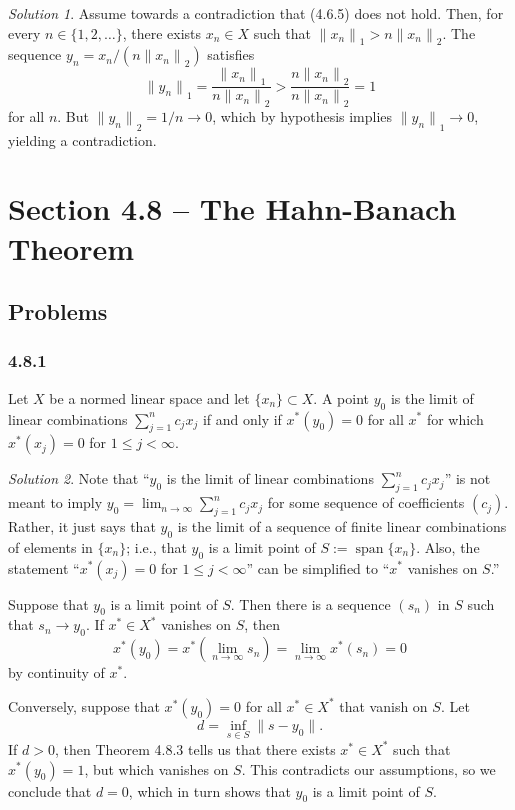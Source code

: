 \documentclass{report}
\DeclareMathOperator{\vspan}{span}
\newcommand{\norm}[1]{{\lVert #1 \rVert}}
\theoremstyle{remark}
\newtheorem*{solution}{Solution}
\begin{document}
\begin{solution}
  Assume towards a contradiction that (4.6.5) does not hold. Then, for every $n \in \{1, 2, \dots\}$, there exists $x_n \in X$ such that $\norm{x_n}_1 > n \norm{x_n}_2$. The sequence $y_n = x_n / (n \norm{x_n}_2)$ satisfies
  \begin{equation*}
    \norm{y_n}_1 = \frac{\norm{x_n}_1}{n \norm{x_n}_2} > \frac{n \norm{x_n}_2}{n \norm{x_n}_2} = 1
  \end{equation*}
  for all $n$. But $\norm{y_n}_2 = 1/n \to 0$, which by hypothesis implies $\norm{y_n}_1 \to 0$, yielding a contradiction.
\end{solution}


\section*{Section 4.8 -- The Hahn-Banach Theorem}

\subsection*{Problems}

\subsubsection*{4.8.1}
Let $X$ be a normed linear space and let $\{x_n\} \subset X$. A point $y_0$ is the limit of linear combinations $\sum_{j=1}^n c_j x_j$ if and only if $x^*(y_0) = 0$ for all $x^*$ for which $x^*(x_j) = 0$ for $1 \le j < \infty$.

\begin{solution}
  Note that ``$y_0$ is the limit of linear combinations $\sum_{j=1}^n c_j x_j$'' is not meant to imply $y_0 = \lim_{n \to \infty} \sum_{j=1}^n c_j x_j$ for some sequence of coefficients $(c_j)$. Rather, it just says that $y_0$ is the limit of a sequence of finite linear combinations of elements in $\{x_n\}$; i.e., that $y_0$ is a limit point of $S := \vspan\{x_n\}$. Also, the statement ``$x^*(x_j) = 0$ for $1 \le j < \infty$'' can be simplified to ``$x^*$ vanishes on $S$.''

  Suppose that $y_0$ is a limit point of $S$. Then there is a sequence $(s_n)$ in $S$ such that $s_n \to y_0$. If $x^* \in X^*$ vanishes on $S$, then
  \begin{equation*}
    x^*(y_0) = x^*\left( \lim_{n \to \infty} s_n \right) = \lim_{n \to \infty} x^*(s_n) = 0
  \end{equation*}
  by continuity of $x^*$.

  Conversely, suppose that $x^*(y_0) = 0$ for all $x^* \in X^*$ that vanish on $S$. Let
  \begin{equation*}
    d = \inf_{s \in S} \norm{s - y_0}.
  \end{equation*}
  If $d > 0$, then Theorem 4.8.3 tells us that there exists $x^* \in X^*$ such that $x^*(y_0) = 1$, but which vanishes on $S$. This contradicts our assumptions, so we conclude that $d = 0$, which in turn shows that $y_0$ is a limit point of $S$.
\end{solution}
\end{document}
